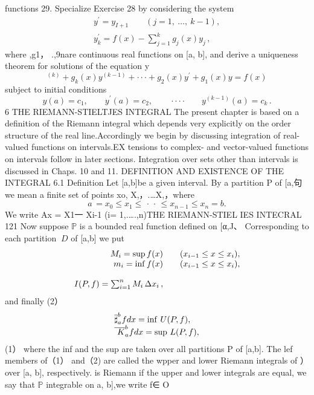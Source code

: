 functions 29. Specialize Exercise 28 by considering the system $$ \begin{array}{c}{{y^{\prime}=y_{I+1}\qquad(j=1,\ \dots,\ k-1),}}\\ {{y_{k}^{\prime}=f(x)-\sum_{j=1}^{k}{g_{j}(x)y_{j}\,,}}}\end{array} $$ where ,g1， .,9nare continuous real functions on [a, b], and derive a uniqueness theorem for solutions of the equation y $$ {}^{(k)}+g_{k}(x)y^{(k-1)}+\cdot\cdot\cdot+g_{2}(x)y^{\prime}+g_{1}(x)y=f(x) $$ subject to initial conditions $$ y(a)=c_{1},\qquad y^{\prime}(a)=c_{2},\qquad\cdot\cdot\cdot\cdot\qquad y^{(k-1)}(a)=c_{k}\,. $$6 THE RIEMANN-STIELTJES INTEGRAL The present chapter is based on a definition of the Riemann integral which depends very explicitly on the order structure of the real line.Accordingly we begin by discussing integration of real-valued functions on intervals.EX tensions to complex- and vector-valued functions on intervals follow in later sections. Integration over sets other than intervals is discussed in Chaps. 10 and 11. DEFINITION AND EXISTENCE OF THE INTEGRAL 6.1 Definition Let [a,b]be a given interval. By a partition P of [a,句 we mean a finite set of points xo, X,，.…X,，where $$ a\,=x_{0}\leq x_{1}\leq\,\cdot\,\cdot\,\leq x_{n-1}\leq x_{n}=b. $$ We write Ax = X1一 Xi-1 (i= 1,.….,n)THE RIEMANN-STIEL IES INTECRAL 121 Now suppose $\mathbb{P}$ is a bounded real function defined on [α,J、 Corresponding to each partition $\ D$ of [a,b] we put $$ \begin{array}{r l}{M_{i}=\operatorname*{sup}f(x)}&{{}\quad(x_{i-1}\leq x\leq x_{i}),}\\ {m_{i}=\operatorname*{inf}f(x)}&{{}\quad(x_{i-1}\leq x\leq x_{i}),}\\ {\operatorname*{}}\\ {I(P,f)=\sum_{i=1}^{n}M_{i}\,\Delta x_{i}\,,}\end{array} $$ and finally (2） $$ \begin{array}{l l}{{\overline{{\sharp}}_{a}^{b}f d x=\mathrm{inf}\ U(P,f),}}\\ {{\overline{{\ K}}_{a}^{b}f d x=\mathrm{sup}\ L(P,f),}}\end{array} $$ (1） where the inf and the sup are taken over all partitions P of [a,b]. The lef members of（1） and（2) are called the wpper and lower Riemann integrals of ） over [a, b], respectively. is Riemann if the upper and lower integrals are equal, we say that $\mathbb{P}$ integrable on a, b],we write f∈ O%